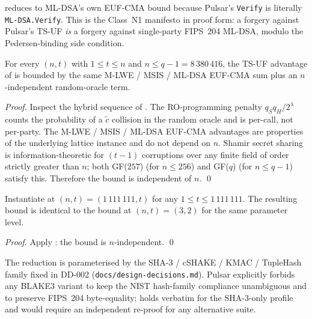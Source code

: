 \begin{remark}
\label{rem:pulsar-output-interchange}
 reduces to ML-DSA's own EUF-CMA bound
because Pulsar's \texttt{Verify} is literally \texttt{ML-DSA.Verify}.
This is the Class~N1 manifesto in proof form: a forgery against
Pulsar's TS-UF \emph{is} a forgery against single-party FIPS~204
ML-DSA, modulo the Pedersen-binding side condition.
\end{remark}

\begin{theorem}
\label{thm:pulsar-scales-n}
For every $(n, t)$ with $1 \le t \le n$ and $n \le q - 1 =
8\,380\,416$, the TS-UF advantage of  is
bounded by the same M-LWE / MSIS / ML-DSA EUF-CMA sum plus an
$n$-independent random-oracle term.
\end{theorem}

\begin{proof}
Inspect the hybrid sequence of . The
RO-programming penalty $q_S q_H / 2^\lambda$ counts the probability
of a $\tilde c$ collision in the random oracle and is per-call, not
per-party. The M-LWE / MSIS / ML-DSA EUF-CMA advantages are
properties of the underlying lattice instance and do not depend on
$n$. Shamir secret sharing is information-theoretic for $(t-1)$
corruptions over any finite field of order strictly greater than
$n$; both GF($257$) (for $n \le 256$) and GF($q$) (for $n \le q-1$)
satisfy this. Therefore the bound is independent of $n$. \qed
\end{proof}

\begin{corollary}[Pulsar at $N^* = 1\,111\,111$ is as secure as Pulsar at $(n, t) = (3, 2)$]
\label{cor:pulsar-extreme-committee}
Instantiate  at $(n, t) = (1\,111\,111, t)$
for any $1 \le t \le 1\,111\,111$. The resulting bound is identical
to the bound at $(n, t) = (3, 2)$ for the same parameter level.
\end{corollary}

\begin{proof}
Apply : the bound is $n$-independent.
\qed
\end{proof}

\begin{remark}
\label{rem:pulsar-hash-suite-invariance}
The reduction is parameterised by the SHA-3 / cSHAKE / KMAC / TupleHash
family fixed in DD-002 (\texttt{docs/design-decisions.md}). Pulsar
explicitly forbids any BLAKE3 variant to keep the NIST hash-family
compliance unambiguous and to preserve FIPS~204 byte-equality;
 holds verbatim for the SHA-3-only profile and
would require an independent re-proof for any alternative suite.
\end{remark}

